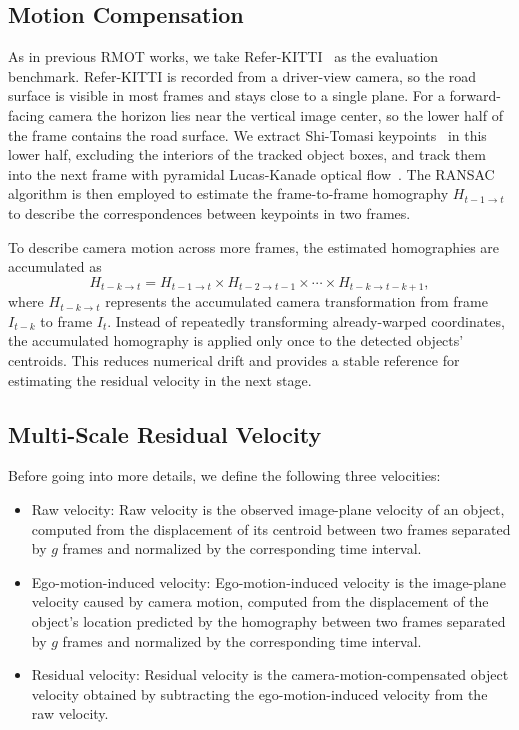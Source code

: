 \documentclass{article}
\begin{document}
\subsection{Motion Compensation}
\label{sec:ego}
As in previous RMOT works, we take Refer-KITTI~\cite{transrmot} as the evaluation benchmark. Refer-KITTI is recorded from a driver-view camera, so the road surface is visible in most frames and stays close to a single plane. For a forward-facing camera the horizon lies near the vertical image center, so the lower half of the frame contains the road surface. We extract Shi-Tomasi keypoints~\cite{shitomasi} in this lower half, excluding the interiors of the tracked object boxes, and track them into the next frame with pyramidal Lucas-Kanade optical flow~\cite{lucaskanade}. The RANSAC~\cite{ransac} algorithm is then employed to estimate the frame-to-frame homography $H_{t-1 \to t}$ to describe the correspondences between keypoints in two frames.

To describe camera motion across more frames, the estimated homographies are accumulated as
\begin{equation}
  H_{t-k \to t} = H_{t-1 \to t} \times H_{t-2 \to t-1} \times \cdots \times H_{t-k \to t-k+1},
  \label{eq:cumulative}
\end{equation}
where $H_{t-k \to t}$ represents the accumulated camera transformation from frame $I_{t-k}$ to frame $I_t$. Instead of repeatedly transforming already-warped coordinates, the accumulated homography is applied only once to the detected objects' centroids. This reduces numerical drift and provides a stable reference for estimating the residual velocity in the next stage.

\subsection{Multi-Scale Residual Velocity}
\label{sec:residual}
Before going into more details, we define the following three velocities:
\begin{itemize}
  \item Raw velocity: Raw velocity is the observed image-plane velocity of an object, computed from the displacement of its centroid between two frames separated by $g$ frames and normalized by the corresponding time interval.
  \item Ego-motion-induced velocity: Ego-motion-induced velocity is the image-plane velocity caused by camera motion, computed from the displacement of the object's location predicted by the homography between two frames separated by $g$ frames and normalized by the corresponding time interval.
  \item Residual velocity: Residual velocity is the camera-motion-compensated object velocity obtained by subtracting the ego-motion-induced velocity from the raw velocity.
\end{itemize}
\end{document}
